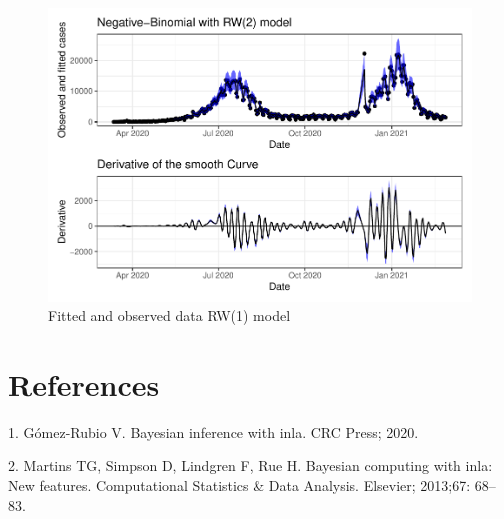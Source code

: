 \documentclass[10pt,letterpaper]{article}
\begin{document}
\begin{figure}[H]
\includegraphics[width=0.99\linewidth]{COVIDincidenceSA_files/figure-latex/unnamed-chunk-13-1} \caption{Fitted and observed data RW(1) model}\label{fig:unnamed-chunk-13}
\end{figure}

\hypertarget{references}{%
\section*{References}\label{references}}

\hypertarget{refs}{}
\leavevmode\hypertarget{ref-gomez2020bayesian}{}%
1. Gómez-Rubio V. Bayesian inference with inla. CRC Press; 2020.

\leavevmode\hypertarget{ref-martins2013bayesian}{}%
2. Martins TG, Simpson D, Lindgren F, Rue H. Bayesian computing with
inla: New features. Computational Statistics \& Data Analysis. Elsevier;
2013;67: 68--83.

\nolinenumbers
\end{document}
